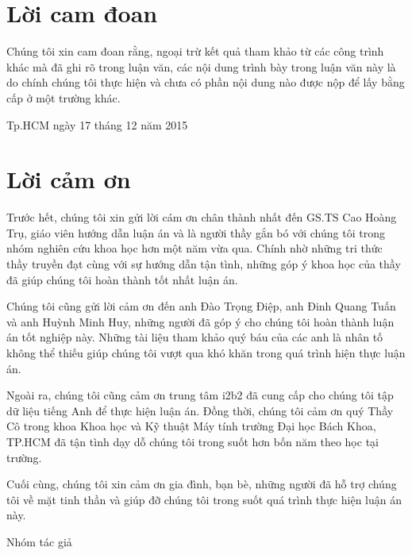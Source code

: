 \documentclass[12pt,a4paper,twoside]{report}
\begin{document}


\chapter*{Lời cam đoan}
Chúng tôi xin cam đoan rằng, ngoại trừ kết quả tham khảo từ các công trình khác mà đã ghi rõ trong luận văn, các nội dung trình bày trong luận văn này là do chính chúng tôi thực hiện và chưa có phần nội dung nào được nộp để lấy bằng cấp ở một trường khác.

\begin{flushright}
Tp.HCM ngày 17 tháng 12 năm 2015
\end{flushright}

\chapter*{Lời cảm ơn}
Trước hết, chúng tôi xin gửi lời cám ơn chân thành nhất đến GS.TS Cao Hoàng Trụ, giáo viên hướng dẫn luận án và là người thầy gắn bó với chúng tôi trong nhóm nghiên cứu khoa học hơn một năm vừa qua. Chính nhờ những tri thức thầy truyền đạt cùng với sự hướng dẫn tận tình, những góp ý khoa học của thầy đã giúp chúng tôi hoàn thành tốt nhất luận án.

Chúng tôi cũng gửi lời cảm ơn đến anh Đào Trọng Điệp, anh Đinh Quang Tuấn và anh Huỳnh Minh Huy, những người đã góp ý cho chúng tôi hoàn thành luận án tốt nghiệp này. Những tài liệu tham khảo quý báu của các anh là nhân tố không thể thiếu giúp chúng tôi vượt qua khó khăn trong quá trình hiện thực luận án.

Ngoài ra, chúng tôi cũng cảm ơn trung tâm i2b2 đã cung cấp cho chúng tôi tập dữ liệu tiếng Anh để thực hiện luận án. Đồng thời, chúng tôi cảm ơn quý Thầy Cô trong khoa Khoa học và Kỹ thuật Máy tính trường Đại học Bách Khoa, TP.HCM đã tận tình dạy dỗ chúng tôi trong suốt hơn bốn năm theo học tại trường.

Cuối cùng, chúng tôi xin cảm ơn gia đình, bạn bè, những người đã hỗ trợ chúng tôi về mặt tinh thần và giúp đỡ chúng tôi trong suốt quá trình thực hiện luận án này.

\begin{flushright}
Nhóm tác giả
\end{flushright}
\end{document}
